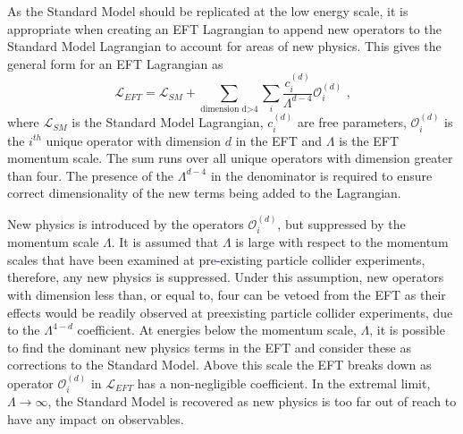 As the Standard Model should be replicated at the low energy scale, it is appropriate when creating an EFT Lagrangian to append new operators to the Standard Model Lagrangian to account for areas of new physics.  This gives the general form for an EFT Lagrangian as \cite{Degrande:2013rea}
%
\begin{equation}
\mathcal{L}_{EFT} = \mathcal{L}_{SM} + \sum_{\text{dimension d>4}} \sum_{i} \frac{c_{i}^{(d)}}{\Lambda^{d-4}} \mathcal{O}_{i}^{(d)} \text{ ,}
\label{equ:eft}
\end{equation}
%
\noindent where $\mathcal{L}_{SM}$ is the Standard Model Lagrangian, $c_{i}^{(d)}$ are free parameters, $\mathcal{O}_{i}^{(d)}$ is the $i^{th}$ unique operator with dimension $d$ in the EFT and $\Lambda$ is the EFT momentum scale.  The sum runs over all unique operators with dimension greater than four.  The presence of the $\Lambda^{d-4}$ in the denominator is required to ensure correct dimensionality of the new terms being added to the Lagrangian.  

New physics is introduced by the operators $\mathcal{O}_{i}^{(d)}$, but suppressed by the momentum scale $\Lambda$.  It is assumed that $\Lambda$ is large with respect to the momentum scales that have been examined at pre\textcolor{blue}{-}existing particle collider experiments, therefore, any new physics is suppressed.  Under this assumption, new operators with dimension less than, or equal to, four can be vetoed from the EFT as their effects would be readily observed at preexisting particle collider experiments, due to the $\Lambda^{4-d}$ coefficient.  At energies below the momentum scale, $\Lambda$, it is possible to find the dominant new physics terms in the EFT and consider these as corrections to the Standard Model.  Above this scale the EFT breaks down as operator $\mathcal{O}_{i}^{(d)}$ in $\mathcal{L}_{EFT}$ has a non-negligible coefficient.  In the extremal limit, $\Lambda \rightarrow \infty$, the Standard Model is recovered as new physics is too far out of reach to have any impact on observables.


